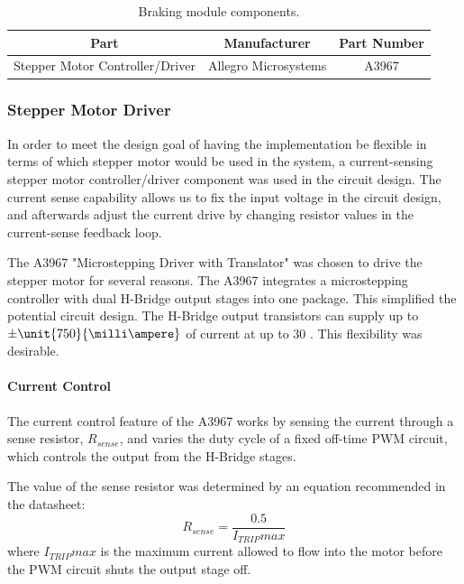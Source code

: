 \begin{table}
  \caption{Braking module components.\label{table:braking_module_components}}
  \centering
  \begin{tabular}{|c|c|c|}
    \hline 
    Part & Manufacturer & Part Number\tabularnewline 
    \hline \hline
    Stepper Motor Controller/Driver & Allegro Microsystems & A3967 \tabularnewline
    \hline
  \end{tabular}
\end{table}

\subsubsection{Stepper Motor Driver}

In order to meet the design goal of having the implementation be flexible in terms of which stepper motor would be used in the system, a current-sensing stepper motor controller/driver component was used in the circuit design. The current sense capability allows us to fix the input voltage in the circuit design, and afterwards adjust the current drive by changing resistor values in the current-sense feedback loop. 

The A3967 "Microstepping Driver with Translator" was chosen to drive the stepper motor for several reasons. The A3967 integrates a microstepping controller with dual H-Bridge output stages into one package. This simplified the potential circuit design. The H-Bridge output transistors can supply up to $\pm\unit{750}{\milli\ampere}$ of current at up to \unit{30}{\volt} \cite{A3967}. This flexibility was desirable.

\paragraph{Current Control}

The current control feature of the A3967 works by sensing the current through a sense resistor, $R_{sense}$, and varies the duty cycle of a fixed off-time PWM circuit, which controls the output from the H-Bridge stages.

The value of the sense resistor was determined by an equation recommended in the datasheet:
\begin{equation}
R_{sense}=\frac{0.5}{I_{TRIP}max}
\end{equation}
where $I_{TRIP}max$ is the maximum current allowed to flow into the motor before the PWM circuit shuts the output stage off.

